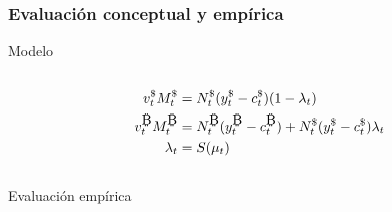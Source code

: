 
\begin{frame}[t]
\frametitle{Evaluación conceptual y empírica}
    
    \begin{block}{Modelo}
    
    \begin{minipage}[t][.20\textheight][t]{\textwidth}

        \begin{column}{0.30\textwidth}
            \tiny
            \begin{align*}
            v_{t}^{\$}{M_{t}^{\$}}&=     N_{t}^{\$}(y_{t}^{\$}-c_{t}^{\$})
            (1-\lambda_t)\\
            v_{t}^{\bitcoinA}{M_{t}^{\bitcoinA}}&=N_{t}^{\bitcoinA}(y_{t}^{\bitcoinA}-c_{t}^{\bitcoinA})+{N_{t}^{\$}(y_{t}^{\$}-c_{t}^{\$})}\lambda_t\\
            {\lambda_t}&={S}({\mu_t})
            \end{align*}
        \end{column}
        \begin{column}{0.45\textwidth}
        
        \end{column}
        
    \end{minipage}
    \end{block}

\begin{block}{Evaluación empírica}

\begin{minipage}[t][.40\textheight][t]{\textwidth}
    

\end{minipage}
\end{block}
\end{frame}
